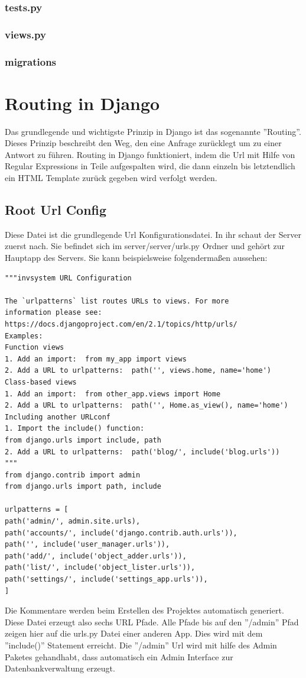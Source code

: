 \documentclass{article}
\begin{document}
\subsubsection{tests.py}
\subsubsection{views.py}
\subsubsection{migrations}


\section{Routing in Django}
Das grundlegende und wichtigste Prinzip in Django ist das sogenannte ''Routing''. Dieses Prinzip beschreibt den Weg, den eine Anfrage zurücklegt um zu einer Antwort zu führen. Routing in Django funktioniert, indem die Url mit Hilfe von Regular Expressions in Teile aufgespalten wird, die dann einzeln bis letztendlich ein HTML Template zurück gegeben wird verfolgt werden.
\subsection{Root Url Config}
Diese Datei ist die grundlegende Url Konfigurationsdatei. In ihr schaut der Server zuerst nach. Sie befindet sich im server/server/urls.py Ordner und gehört zur Hauptapp des Servers. Sie kann beispielsweise folgendermaßen aussehen:
\begin{verbatim}
"""invsystem URL Configuration

The `urlpatterns` list routes URLs to views. For more
information please see:
https://docs.djangoproject.com/en/2.1/topics/http/urls/
Examples:
Function views
1. Add an import:  from my_app import views
2. Add a URL to urlpatterns:  path('', views.home, name='home')
Class-based views
1. Add an import:  from other_app.views import Home
2. Add a URL to urlpatterns:  path('', Home.as_view(), name='home')
Including another URLconf
1. Import the include() function: 
from django.urls import include, path
2. Add a URL to urlpatterns:  path('blog/', include('blog.urls'))
"""
from django.contrib import admin
from django.urls import path, include

urlpatterns = [
path('admin/', admin.site.urls),
path('accounts/', include('django.contrib.auth.urls')),
path('', include('user_manager.urls')),
path('add/', include('object_adder.urls')),
path('list/', include('object_lister.urls')),
path('settings/', include('settings_app.urls')),
]
\end{verbatim}
Die Kommentare werden beim Erstellen des Projektes automatisch generiert. Diese Datei erzeugt also sechs URL Pfade. Alle Pfade bis auf den ''/admin'' Pfad zeigen hier auf die urls.py Datei einer anderen App. Dies wird mit dem ''include()'' Statement erreicht. Die ''/admin'' Url wird mit hilfe des Admin Paketes gehandhabt, dass automatisch ein Admin Interface zur Datenbankverwaltung erzeugt. 
\end{document}
